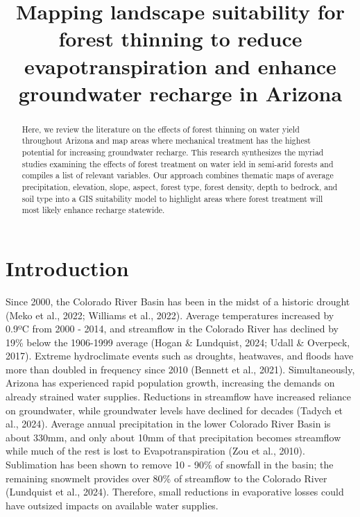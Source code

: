 \documentclass[
]{agujournal2019}
\begin{document}
\title{Mapping landscape suitability for forest thinning to reduce
evapotranspiration and enhance groundwater recharge in Arizona}



\begin{abstract}
Here, we review the literature on the effects of forest thinning on
water yield throughout Arizona and map areas where mechanical treatment
has the highest potential for increasing groundwater recharge. This
research synthesizes the myriad studies examining the effects of forest
treatment on water ield in semi-arid forests and compiles a list of
relevant variables. Our approach combines thematic maps of average
precipitation, elevation, slope, aspect, forest type, forest density,
depth to bedrock, and soil type into a GIS suitability model to
highlight areas where forest treatment will most likely enhance recharge
statewide.
\end{abstract}





\section{Introduction}\label{introduction}

Since 2000, the Colorado River Basin has been in the midst of a historic
drought (Meko et al., 2022; Williams et al., 2022). Average temperatures
increased by 0.9ºC from 2000 - 2014, and streamflow in the Colorado
River has declined by 19\% below the 1906-1999 average (Hogan \&
Lundquist, 2024; Udall \& Overpeck, 2017). Extreme hydroclimate events
such as droughts, heatwaves, and floods have more than doubled in
frequency since 2010 (Bennett et al., 2021). Simultaneously, Arizona has
experienced rapid population growth, increasing the demands on already
strained water supplies. Reductions in streamflow have increased
reliance on groundwater, while groundwater levels have declined for
decades (Tadych et al., 2024). Average annual precipitation in the lower
Colorado River Basin is about 330mm, and only about 10mm of that
precipitation becomes streamflow while much of the rest is lost to
Evapotranspiration (Zou et al., 2010). Sublimation has been shown to
remove 10 - 90\% of snowfall in the basin; the remaining snowmelt
provides over 80\% of streamflow to the Colorado River (Lundquist et
al., 2024). Therefore, small reductions in evaporative losses could have
outsized impacts on available water supplies.
\end{document}
